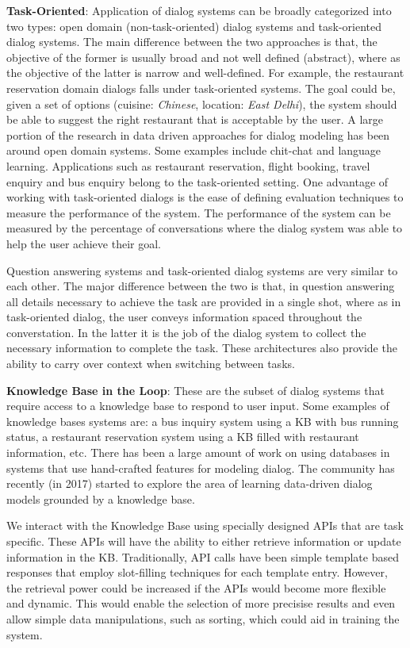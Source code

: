 \noindent\textbf{Task-Oriented}: Application of dialog systems can be broadly categorized into two types: open domain (non-task-oriented) dialog systems and task-oriented dialog systems. The main difference between the two approaches is that, the objective of the former is usually broad and not well defined (abstract), where as the objective of the latter is narrow and well-defined. For example, the restaurant reservation domain dialogs falls under task-oriented systems. The goal could be, given a set of options (cuisine: {\em Chinese}, location: {\em East Delhi}), the system should be able to suggest the right restaurant that is acceptable by the user. A large portion of the research in data driven approaches for dialog modeling has been around open domain systems. Some examples include chit-chat and language learning. Applications such as restaurant reservation, flight booking, travel enquiry and bus enquiry belong to the task-oriented setting. One advantage of working with task-oriented dialogs is the ease of defining evaluation techniques to measure the performance of the system. The performance of the system can be measured by the percentage of conversations where the dialog system was able to help the user achieve their goal. 

Question answering systems and task-oriented dialog systems are very similar to each other. The major difference between the two is that, in question answering all details necessary to achieve the task are provided in a single shot, where as in task-oriented dialog, the user conveys information spaced throughout the converstation. In the latter it is the job of the dialog system to collect the necessary information to complete the task. These architectures also provide the ability to carry over context when switching between tasks.

\noindent\textbf{Knowledge Base in the Loop}: These are the subset of dialog systems that require access to a knowledge base to respond to user input. Some examples of knowledge bases systems are: a bus inquiry system using a KB with bus running status, a restaurant reservation system using a KB filled with restaurant information, etc. There has been a large amount of work on using databases in systems that use hand-crafted features for modeling dialog. The community has recently (in 2017) started to explore the area of learning data-driven dialog models grounded by a knowledge base.

We interact with the Knowledge Base using specially designed APIs that are task specific. These APIs will have the ability to either retrieve information or update information in the KB. Traditionally, API calls have been simple template based responses that employ slot-filling techniques for each template entry. However, the retrieval power could be increased if the APIs would become more flexible and dynamic. This would enable the selection of more precisise results and even allow simple data manipulations, such as sorting, which could aid in training the system.

